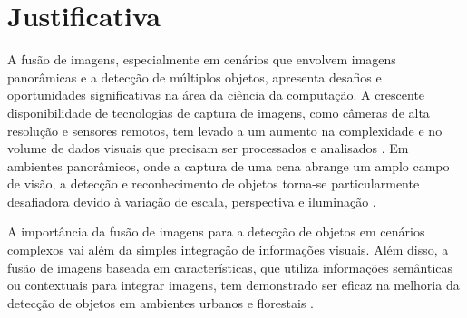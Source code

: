 

\section{Justificativa}\label{sec:justificativa}

A fusão de imagens, especialmente em cenários que envolvem imagens panorâmicas e a detecção de múltiplos objetos, apresenta desafios e oportunidades significativas na área da ciência da computação. A crescente disponibilidade de tecnologias de captura de imagens, como câmeras de alta resolução e sensores remotos, tem levado a um aumento na complexidade e no volume de dados visuais que precisam ser processados e analisados \cite{smith2023}. Em ambientes panorâmicos, onde a captura de uma cena abrange um amplo campo de visão, a detecção e reconhecimento de objetos torna-se particularmente desafiadora devido à variação de escala, perspectiva e iluminação \cite{gupta2022}.

A importância da fusão de imagens para a detecção de objetos em cenários complexos vai além da simples integração de informações visuais.  Além disso, a fusão de imagens baseada em características, que utiliza informações semânticas ou contextuais para integrar imagens, tem demonstrado ser eficaz na melhoria da detecção de objetos em ambientes urbanos e florestais \cite{guan2023}. 

